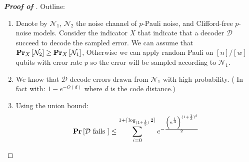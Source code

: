 \documentclass[manuscript,screen,review]{acmart}
\begin{document}
\begin{proof}[\textbf{Proof of }]

  Outline: 
  \begin{enumerate}
    \item Denote by $\mathcal{N}_{1}$, $\mathcal{N}_{2}$ the noise channel of $p$-Pauli noise, and Clifford-free $p$-noise models. Consider the indicator $X$ that indicate that a decoder $\mathcal{D}$ succeed to decode the sampled error. We can assume that $\prbm{\mathcal{N}_{2}}{X} \ge \prbm{\mathcal{N}_{1}}{X}$, Otherwise we can apply random Pauli on $[n]/[w]$ qubits with error rate $p$ so the error will be sampled according to $\mathcal{N}_1$.
    \item We know that $\mathcal{D}$ decode errors drawn from $\mathcal{N}_{1}$ with high probability. ( In fact with:  $1 - e^{-\Theta(d)}$ where $d$ is the code distance.)   
    \item Using the union bound: \begin{equation*}
        \begin{split}
      \prb{ \mathcal{D} \text{ fails } } \le \sum_{i=0}^{1 + \lceil \log_{(1 + \frac{1}{3})}{2} \rceil }{ e^{ - \frac{\left( n^\frac{1}{4} \right)^{  (1 + \frac{1}{3})^{i}  }}{2}}  }
        \end{split}
      \end{equation*}
\end{enumerate}


\end{proof}




%
\cite{leverrier2022quantum}
\cite{moore1998parallel}
\cite{bravyi2012magic}
\cite{Tillich_2014}
\cite{meier2012magicstate}

\printbibliography
\end{document}
